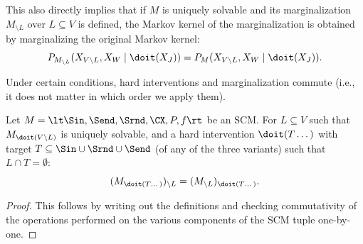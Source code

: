 \begin{Rem}
This also directly implies that if $M$ is uniquely solvable and its marginalization $M_{\setminus L}$ over $L \subseteq V$ is defined, the Markov kernel of the marginalization is obtained by marginalizing the original Markov kernel:
$$P_{M_{\setminus L}}(X_{V\setminus L},X_W \mid \doit(X_J)) = P_{M}(X_{V\setminus L},X_W \mid \doit(X_J)).$$
\end{Rem}

Under certain conditions, hard interventions and marginalization commute (i.e., it does not matter in which
order we apply them).
\begin{Prp}\label{prp:interventions_marginalizations_commute}
Let $M = \lt \Sin, \Send, \Srnd, \CX, P, f \rt$ be an SCM.
    For $L \subseteq V$ such that $M_{\doit(V\setminus L)}$ is uniquely solvable,
    and a hard intervention $\doit(T\dots)$ with target $T \subseteq \Sin \cup \Srnd \cup \Send$ (of any of the three variants) such that $L \cap T = \emptyset$:
    $$(M_{\doit(T\dots)})_{\setminus L} = (M_{\setminus L})_{\doit(T\dots)}.$$
\end{Prp}
\begin{proof}
  This follows by writing out the definitions and checking commutativity of
  the operations performed on the various components of the SCM tuple one-by-one. 
\end{proof}

